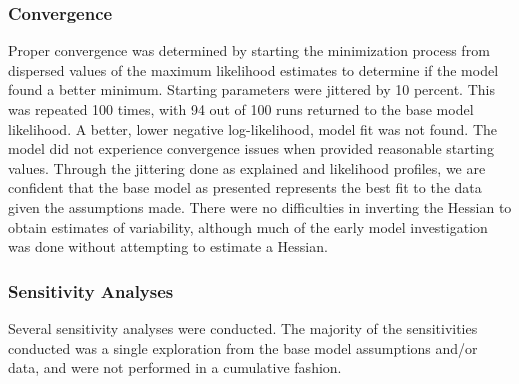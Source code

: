 \documentclass[11pt,
  english,
  a4paper,
]{article}
\begin{document}
\leavevmode\tagmcend\tagstructend


\hypertarget{convergence}{%
\subsubsection{Convergence}\label{convergence}}

\leavevmode\tagmcend\tagstructend


Proper convergence was determined by starting the minimization process from dispersed values of the maximum likelihood estimates to determine if the model found a better minimum. Starting parameters were jittered by 10 percent. This was repeated 100 times, with 94 out of 100 runs returned to the base model likelihood. A better, lower negative log-likelihood, model fit was not found. The model did not experience convergence issues when provided reasonable starting values. Through the jittering done as explained and likelihood profiles, we are confident that the base model as presented represents the best fit to the data given the assumptions made. There were no difficulties in inverting the Hessian to obtain estimates of variability, although much of the early model investigation was done without attempting to estimate a Hessian.

\leavevmode\tagmcend\tagstructend\par


\hypertarget{sens}{%
\subsubsection{Sensitivity Analyses}\label{sens}}

\leavevmode\tagmcend\tagstructend


Several sensitivity analyses were conducted. The majority of the sensitivities conducted was a single exploration from the base model assumptions and/or data, and were not performed in a cumulative fashion.

\leavevmode\tagmcend\tagstructend\par
\end{document}

